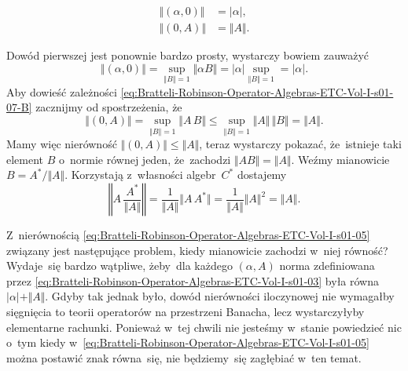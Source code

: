 \documentclass[a4paper,11pt]{article}
\begin{document}
\begin{subequations}

  \begin{align}
    \label{eq:Bratteli-Robinson-Operator-Algebras-ETC-Vol-I-s01-07-A}
    \Vert ( \alpha, 0 ) \Vert &= | \alpha |, \\
    \label{eq:Bratteli-Robinson-Operator-Algebras-ETC-Vol-I-s01-07-B}
    \Vert ( 0, A ) \Vert &= \Vert A \Vert.
  \end{align}

\end{subequations}

\noindent
Dowód pierwszej jest ponownie bardzo prosty, wystarczy bowiem zauważyć
\begin{equation}
  \label{eq:Bratteli-Robinson-Operator-Algebras-ETC-Vol-I-s01-08}
  \Vert ( \alpha, 0 ) \Vert =
  \sup_{ \Vert B \Vert = 1 } \Vert \alpha B \Vert =
  | \alpha | \sup_{ \Vert B \Vert = 1 } = | \alpha |.
\end{equation}
Aby dowieść zależności
\eqref{eq:Bratteli-Robinson-Operator-Algebras-ETC-Vol-I-s01-07-B} zacznijmy
od spostrzeżenia, że
\begin{equation}
  \label{eq:Bratteli-Robinson-Operator-Algebras-ETC-Vol-I-s01-09}
  \Vert ( 0, A ) \Vert =
  \sup_{ \Vert B \Vert = 1 } \Vert A \, B \Vert \leq
  \sup_{ \Vert B \Vert = 1 } \Vert A \Vert \, \Vert B \Vert = \Vert A \Vert.
\end{equation}
Mamy więc nierówność $\Vert ( 0, A ) \Vert \leq \Vert A \Vert$, teraz wystarczy pokazać,
że~istnieje taki element $B$ o~normie równej jeden, że~zachodzi
$\Vert A B \Vert = \Vert A \Vert$. Weźmy mianowicie $B = A^{ * } / \Vert A \Vert$. Korzystają
z~własności algebr~$C^{ * }$ dostajemy
\begin{equation}
  \label{eq:Bratteli-Robinson-Operator-Algebras-ETC-Vol-I-s01-09}
  \left\Vert A \, \frac{ A^{ * } }{ \Vert A \Vert } \right\Vert =
  \frac{ 1 }{ \Vert A \Vert } \Vert A \, A^{ * } \Vert =
  \frac{ 1 }{ \Vert A \Vert } \Vert A \Vert^{ 2 } = \Vert A \Vert.
\end{equation}

Z~nierównością
\eqref{eq:Bratteli-Robinson-Operator-Algebras-ETC-Vol-I-s01-05} związany
jest następujące problem, kiedy mianowicie zachodzi w~niej równość?
Wydaje~się bardzo wątpliwe, żeby~dla każdego $( \alpha, A )$ norma zdefiniowana
przez \eqref{eq:Bratteli-Robinson-Operator-Algebras-ETC-Vol-I-s01-03} była
równa $| \alpha | + \Vert A \Vert$. Gdyby tak jednak było, dowód nierówności iloczynowej
nie wymagałby sięgnięcia to teorii operatorów na przestrzeni Banacha, lecz
wystarczyłyby elementarne rachunki. Ponieważ w~tej chwili nie jesteśmy
w~stanie powiedzieć nic o~tym kiedy
w~\eqref{eq:Bratteli-Robinson-Operator-Algebras-ETC-Vol-I-s01-05} można
postawić znak równa~się, nie będziemy~się zagłębiać w~ten temat.
\end{document}
